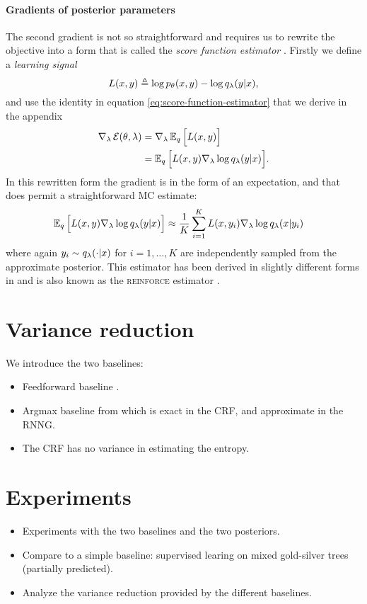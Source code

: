 \paragraph{Gradients of posterior parameters}
The second gradient is not so straightforward and requires us to rewrite the objective into a form that is called the \textit{score function estimator} \citep{fu2006gradient}. Firstly we define a \textit{learning signal}
\begin{equation}
  L(x, y) \triangleq \log p_{\theta}(x, y) - \log q_{\lambda}(y | x),
\end{equation}
and use the identity in equation \ref{eq:score-function-estimator} that we derive in the appendix
\begin{align*}
  \nabla_{\lambda} \operatorname{\mathcal{E}}(\theta, \lambda)
    &= \nabla_{\lambda} \operatorname{\mathbb{E}}_{q} \Big[ L(x, y) \Big] \\
    &= \operatorname{\mathbb{E}}_{q} \Big[ L(x, y) \nabla_{\lambda} \log q_{\lambda}(y | x) \Big].
\end{align*}
In this rewritten form the gradient is in the form of an expectation, and that does permit a straightforward MC estimate:
\begin{align}
    \operatorname{\mathbb{E}}_{q} \Big[ L(x, y) \nabla_{\lambda} \log q_{\lambda}(y | x) \Big]
        &\approx \frac{1}{K}\sum_{i=1}^K  L(x, y_i)\nabla_{\lambda} \log q_{\lambda}(x | y_i)
\end{align}
where again $y_i \sim q_{\lambda}(\cdot | x)$ for $i=1,\dots,K$ are independently sampled from the approximate posterior. This estimator has been derived in slightly different forms in \citet{williams1992reinforce,paisley2012viss,mnih2014nvil,ranganath2014black,miao2016discrete} and is also known as the \textsc{reinforce} estimator \citep{williams1992reinforce}.


\section{Variance reduction}
We introduce the two baselines:
\begin{itemize}
  \item Feedforward baseline \citep{miao2016discrete}.
  \item Argmax baseline from \citet{rennie2017argmax} which is exact in the CRF, and approximate in the RNNG.
  \item The CRF has no variance in estimating the entropy.
\end{itemize}


\section{Experiments}
\begin{itemize}
  \item Experiments with the two baselines and the two posteriors.
  \item Compare to a simple baseline: supervised learing on mixed gold-silver trees (partially predicted).
  \item Analyze the variance reduction provided by the different baselines.
\end{itemize}


